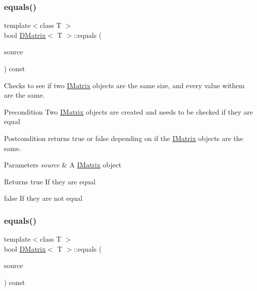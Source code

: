 \subsubsection{\texorpdfstring{equals()}{equals()}\hspace{0.1cm}{\footnotesize\ttfamily [4/6]}}
{\footnotesize\ttfamily template$<$class T $>$ \\
bool \mbox{\hyperlink{class_d_matrix}{D\+Matrix}}$<$ T $>$\+::equals (\begin{DoxyParamCaption}\item[{const \mbox{\hyperlink{class_i_matrix}{I\+Matrix}}$<$ \mbox{\hyperlink{class_u_matrix}{U\+Matrix}}$<$ T $>$, T $>$ \&}]{source }\end{DoxyParamCaption}) const}



Checks to see if two \mbox{\hyperlink{class_i_matrix}{I\+Matrix}} objects are the same size, and every value withem are the same. 

\begin{DoxyPrecond}{Precondition}
Two \mbox{\hyperlink{class_i_matrix}{I\+Matrix}} objects are created and needs to be checked if they are equal 
\end{DoxyPrecond}
\begin{DoxyPostcond}{Postcondition}
returns true or false depending on if the \mbox{\hyperlink{class_i_matrix}{I\+Matrix}} objects are the same.
\end{DoxyPostcond}

\begin{DoxyParams}{Parameters}
{\em source} & A \mbox{\hyperlink{class_i_matrix}{I\+Matrix}} object \\
\hline
\end{DoxyParams}
\begin{DoxyReturn}{Returns}
true If they are equal 

false If they are not equal 
\end{DoxyReturn}
\mbox{\label{class_d_matrix_a42bc5a61e5206a8380de8784bac5dfeb}} 
\subsubsection{\texorpdfstring{equals()}{equals()}\hspace{0.1cm}{\footnotesize\ttfamily [5/6]}}
{\footnotesize\ttfamily template$<$class T $>$ \\
bool \mbox{\hyperlink{class_d_matrix}{D\+Matrix}}$<$ T $>$\+::equals (\begin{DoxyParamCaption}\item[{const \mbox{\hyperlink{class_i_matrix}{I\+Matrix}}$<$ \mbox{\hyperlink{class_s_matrix}{S\+Matrix}}$<$ T $>$, T $>$ \&}]{source }\end{DoxyParamCaption}) const}



